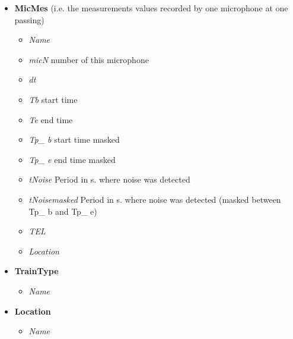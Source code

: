 \documentclass{article}\usepackage[]{graphicx}\usepackage[]{color}
\begin{document}
\begin{itemize}
\begin{itemize}
  \end{itemize}
\item {\bf MicMes} (i.e. the measurements values recorded by one microphone at one passing)
  \begin{itemize}
    \item {\it Name}
    \item {\it micN} number of this microphone    
    \item {\it dt}
    \item {\it Tb} start time
    \item {\it Te} end time
    \item {\it Tp\_ b} start time masked
    \item {\it Tp\_ e} end time masked
    \item {\it tNoise} Period in s. where noise was detected
    \item {\it tNoisemasked} Period in s. where noise was detected (masked between Tp\_ b and Tp\_ e)
    \item {\it TEL}
    \item {\it Location}
  \end{itemize}
\item {\bf TrainType}
  \begin{itemize}
    \item {\it Name}
  \end{itemize}
\item {\bf Location}
  \begin{itemize}
    \item {\it Name}
  \end{itemize}
\end{itemize}
\end{document}
